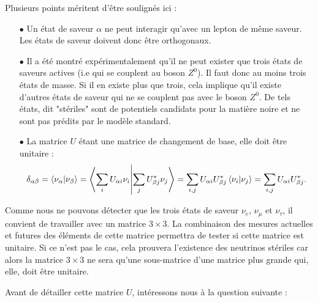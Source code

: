             Plusieurs points méritent d'être soulignés ici :
            \begin{itemize}
                \item[$\bullet$] Un état de saveur $\alpha$ ne peut interagir qu'avec un lepton de même saveur. Les états de saveur doivent donc être orthogonaux.
                \item[$\bullet$] Il a été montré expérimentalement qu'il ne peut exister que trois états de saveurs actives (i.e qui se couplent au boson $Z^0$)\cite{pdg2018}. Il faut donc au moins trois états de masse. Si il en existe plus que trois, cela implique qu'il existe d'autres états de saveur qui ne se couplent pas avec le boson $Z^0$. De tels états, dit "stériles" sont de potentiels candidats pour la matière noire et ne sont pas prédits par le modèle standard.
                \item[$\bullet$] La matrice $U$ étant une matrice de changement de base, elle doit être unitaire :
                \begin{equation*}
                    \delta_{\alpha\beta} = \braket{\nu_{\alpha}}{\nu_{\beta}} = \braket{\sum_i U_{\alpha i}\nu_i}{\sum_j U_{\beta j}^*\nu_j} = \sum_{i,j} U_{\alpha i}U_{\beta j}^* \braket{\nu_i}{\nu_j} = \sum_{i,j} U_{\alpha i}U_{\beta j}^*.
                \end{equation*}
            \end{itemize}
            Comme nous ne pouvons détecter que les trois états de saveur $\nu_e$, $\nu_{\mu}$ et $\nu_{\tau}$, il convient de travailler avec un matrice $3\times3$. La combinaison des mesures actuelles et futures des éléments de cette matrice\cite{Qian2013} permettra de tester si cette matrice est unitaire. Si ce n'est pas le cas, cela prouvera l'existence des neutrinos stériles car alors la matrice $3\times3$ ne sera qu'une sous-matrice d'une matrice plus grande qui, elle, doit être unitaire.
            
            Avant de détailler cette matrice $U$, intéressons nous à la question suivante : 
